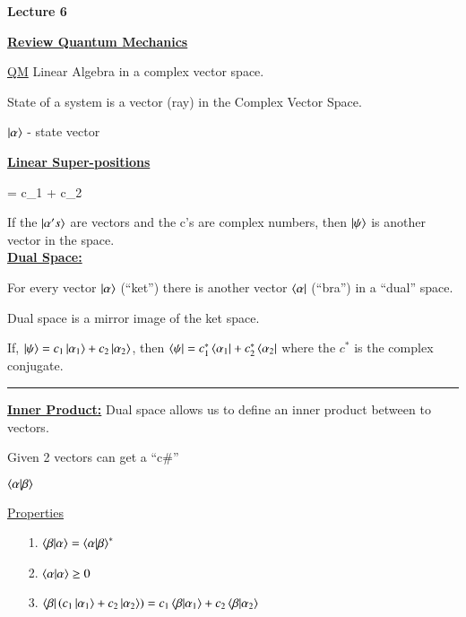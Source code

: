 



\thispagestyle{fancy}

\begin{center}
{\huge \textbf{Lecture 6}}
\end{center}

{\fontsize{14}{16}\selectfont

\textbf{\underline{Review Quantum Mechanics}} 

\underline{QM} Linear Algebra in a complex vector space.

State of a system is a vector (ray) in the Complex Vector Space. 

\begin{center}
$\ket \alpha$  - state vector
\end{center}


\textbf{\underline{Linear Super-positions} }

\be
\ket \psi = c_1  + c_2 
\ee

If the $\ket{\alpha's}$ are vectors and the c's are complex numbers, then $\ket \psi$ is another vector in the space.\\


\textbf{\underline{Dual Space:}}

For every vector $\ket \alpha$ (``ket'') there is another vector $\bra \alpha$ (``bra'') in a ``dual'' space.

Dual space is a mirror image  of the ket space.


If, $\ket \psi = c_1 \ket{\alpha_1} + c_2 \ket{\alpha_2}$, then $\bra \psi = c_1^* \bra{\alpha_1} + c_2^* \bra{\alpha_2}$
where the $c^*$ is the complex conjugate.

\noindent\rule{\textwidth}{1pt}

\textbf{\underline{Inner Product:}} Dual space allows us to define an inner product between to vectors. 

Given 2 vectors can get a ``c\#'' 

$\braket{\alpha|\beta}$

\underline{Properties}
\begin{itemize}
\item[1.] $\braket{\beta|\alpha} = \braket{\alpha| \beta}^*$
\item[2.] $\braket{\alpha|\alpha} \geq 0$
\item[3.] $\bra{\beta} (c_1 \ket{\alpha_1} + c_2 \ket{\alpha_2} ) =  c_1 \braket{\beta|\alpha_1} + c_2 \braket{\beta| \alpha_2}$
\end{itemize}

}
